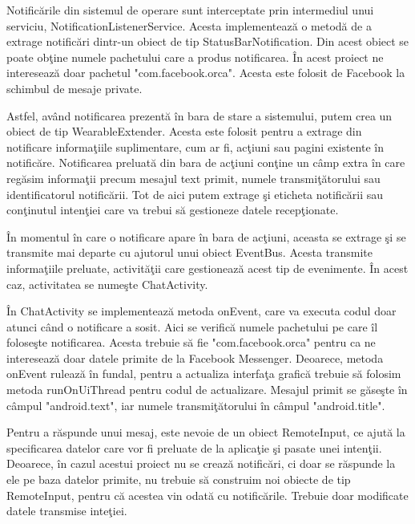 Notific\u{a}rile din sistemul de operare sunt interceptate prin intermediul unui serviciu, NotificationListenerService. Acesta implementeaz\u{a} o metod\u{a} de a extrage notific\u{a}ri dintr-un obiect de tip StatusBarNotification. Din acest obiect se poate ob\c{t}ine numele pachetului care a produs notificarea. \^{I}n acest proiect ne intereseaz\u{a} doar pachetul "com.facebook.orca". Acesta este folosit de Facebook la schimbul de mesaje private. 

Astfel, av\^{a}nd notificarea prezent\u{a} \^{i}n bara de stare a sistemului, putem crea un obiect de tip WearableExtender. Acesta este folosit pentru a extrage din notificare informa\c{t}iile suplimentare, cum ar fi, ac\c{t}iuni sau pagini existente \^{i}n notific\u{a}re. Notificarea preluat\u{a} din bara de ac\c{t}iuni con\c{t}ine un c\^{a}mp extra \^{i}n care reg\u{a}sim informa\c{t}ii precum mesajul text primit, numele transmi\c{t}\u{a}torului sau identificatorul notific\u{a}rii. Tot de aici putem extrage \c{s}i eticheta notific\u{a}rii sau con\c{t}inutul inten\c{t}iei care va trebui s\u{a} gestioneze datele recep\c{t}ionate.

\^{I}n momentul \^{i}n care o notificare apare \^{i}n bara de ac\c{t}iuni, aceasta se extrage \c{s}i se transmite mai departe cu ajutorul unui obiect EventBus. Acesta transmite informa\c{t}iile preluate, activit\u{a}\c{t}ii care gestioneaz\u{a} acest tip de evenimente. \^{I}n acest caz, activitatea se nume\c{s}te ChatActivity.

\^{I}n ChatActivity se implementeaz\u{a} metoda onEvent, care va executa codul doar atunci c\^{a}nd o notificare a sosit. Aici se verific\u{a} numele pachetului pe care \^{i}l folose\c{s}te notificarea. Acesta trebuie s\u{a} fie "com.facebook.orca" pentru ca ne intereseaz\u{a} doar datele primite de la Facebook Messenger. Deoarece, metoda onEvent ruleaz\u{a} \^{i}n fundal, pentru a actualiza interfa\c{t}a grafic\u{a} trebuie s\u{a} folosim metoda runOnUiThread pentru codul de actualizare. Mesajul primit se g\u{a}se\c{s}te \^{i}n c\^{a}mpul "android.text", iar numele transmi\c{t}\u{a}torului \^{i}n c\^{a}mpul "android.title".

Pentru a r\u{a}spunde unui mesaj, este nevoie de un obiect RemoteInput, ce ajut\u{a} la specificarea datelor care vor fi preluate de la aplica\c{t}ie \c{s}i pasate unei inten\c{t}ii. Deoarece, \^{i}n cazul acestui proiect nu se creaz\u{a} notific\u{a}ri, ci doar se r\u{a}spunde la ele pe baza datelor primite, nu trebuie s\u{a} construim noi obiecte de tip RemoteInput, pentru c\u{a} acestea vin odat\u{a} cu notific\u{a}rile. Trebuie doar modificate datele transmise inte\c{t}iei. 

